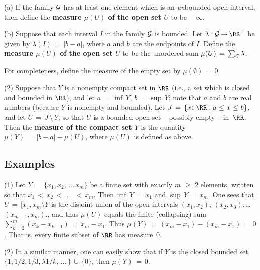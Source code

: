         \h (a) If the family ${\cal G}$ has at least one element which is an {\em un}bounded open interval,
    then define the {\bf measure ${\mu}(U)$ of the open set $U$} to be~$+{\infty}$.

        \h (b) Suppose that each interval $I$ in the family ${\cal G}$ is bounded. Let ${\lambda}:{\cal G} \,{\rightarrow}\, {\RR}^{+}$
    be given by ${\lambda}(I) \,=\, |b-a|$, where $a$ and $b$ are the endpoints of $I$.
    Define the {\bf measure ${\mu}(U)$ of the open set $U$} to be the unordered sum ${\mu}(U) \,=\, \sum_{{\cal G}} {\lambda}$.

        For completeness, define the measure of the empty set by ${\mu}({\emptyset}) \,=\, 0$.

\V

        (2) Suppose that $Y$ is a nonempty compact set in ${\RR}$ (i.e., a set which is closed and bounded in ${\RR}$),
    and let $a \,=\, {\inf}\,Y$, $b \,=\, {\sup}\,Y$; note that $a$ and $b$ are real numbers (because $Y$ is nonempty and bounded).
    Let $J \,=\, \{x{\in}{\RR}: a\,\,{\leq}\,\,x\,\,{\leq}\,\,b\}$, and let $U \,=\, J\,{\setminus}\,Y$, so that $U$ is a bounded open set -- possibly empty -- in~${\RR}$.
    Then the {\bf measure of the compact set $Y$} is the quantity ${\mu}(Y) \,=\, |b-a| - {\mu}(U)$, where ${\mu}(U)$ is defined as above.

\V
\V


        \subsection{\small{{\bf Examples}}}
        \label{ExampG25.30}

\V

        (1) Let $Y \,=\, \{x_{1},x_{2},\,{\ldots}\,x_{m}\}$ be a finite set with exactly $m\,\,{\geq}\,\,2$ elements, written so that $x_{1}\,<\,x_{2}\,<\,\,{\ldots}\,\,<\,x_{m}$.
    Then ${\inf}\,Y \,=\, x_{1}$ and ${\sup}\,Y \,=\, x_{m}$. One sees that $U \,=\, [x_{1},x_{m}{\setminus}Y$ is the disjoint union of the open intervals $(x_{1},x_{2})$, $(x_{2},x_{3})$,\,{\ldots}\,$(x_{m-1},x_{m})$., and thus ${\mu}(U)$ equals the finite (collapsing) sum $\sum_{k=2}^{m} (x_{k} - x_{k-1}) \,=\, x_{m} - x_{1}$.
    Thus ${\mu}(Y) \,=\, (x_{m} - x_{1}) - (x_{m} - x_{1}) \,=\, 0$.
    That is, every finite subset of ${\RR}$ has measure~$0$.

\V

        (2) In a similar manner, one can easily show that if $Y$ is the closed bounded set $\{1, 1/2, 1/3, {\lambda}1/k,\,{\ldots}\,\}\,{\cup}\,\{0\}$,
    then ${\mu}(Y) \,=\, 0$.


